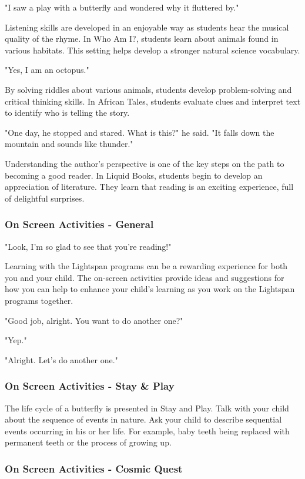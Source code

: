 "I saw a play with a butterfly and wondered why it fluttered by."

Listening skills are developed in an enjoyable way as students hear the musical quality of the rhyme.
In Who Am I?, students learn about animals found in various habitats.
This setting helps develop a stronger natural science vocabulary.

"Yes, I am an octopus."

By solving riddles about various animals, students develop problem-solving and critical thinking skills.
In African Tales, students evaluate clues and interpret text to identify who is telling the story.

"One day, he stopped and stared. What is this?" he said. "It falls down the mountain and sounds like thunder."

Understanding the author's perspective is one of the key steps on the path to becoming a good reader.
In Liquid Books, students begin to develop an appreciation of literature.
They learn that reading is an exciting experience, full of delightful surprises.

\subsubsection{On Screen Activities - General}

"Look, I'm so glad to see that you're reading!"

Learning with the Lightspan programs can be a rewarding experience for both you and your child.
The on-screen activities provide ideas and suggestions for how you can help to enhance your child's learning as you work on the Lightspan programs together.

"Good job, alright. You want to do another one?"

"Yep."

"Alright. Let's do another one."

\subsubsection{On Screen Activities - Stay \& Play}

The life cycle of a butterfly is presented in Stay and Play.
Talk with your child about the sequence of events in nature.
Ask your child to describe sequential events occurring in his or her life.
For example, baby teeth being replaced with permanent teeth or the process of growing up.

\subsubsection{On Screen Activities - Cosmic Quest}

